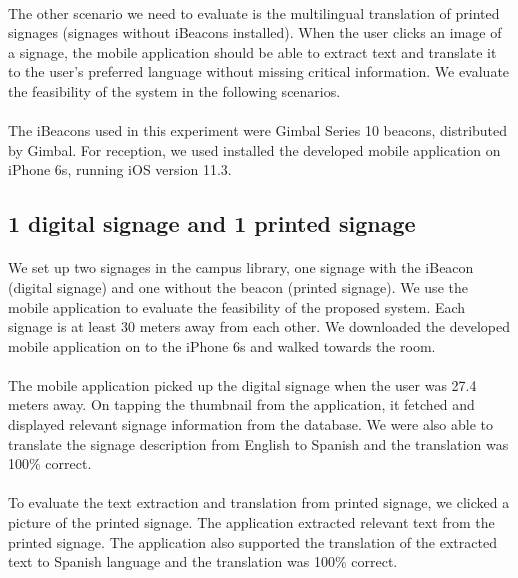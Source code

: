 \documentclass[12pt]{article}
\begin{document}
\paragraph{}The other scenario we need to evaluate is the multilingual translation of printed signages (signages without iBeacons installed). When the user clicks an image of a signage, the mobile application should be able to extract text and translate it to the user's preferred language without missing critical information. We evaluate the feasibility of the system in the following scenarios.

\paragraph{}The iBeacons used in this experiment were Gimbal Series 10 beacons, distributed by Gimbal. For reception, we used installed the developed mobile application on iPhone 6s, running iOS version 11.3.

\subsection{1 digital signage and 1 printed signage }
\label{oneone}
\paragraph{}We set up two signages in the campus library, one signage with the iBeacon (digital signage) and one without the beacon (printed signage). We use the mobile application to evaluate the feasibility of the proposed system. Each signage is at least 30 meters away from each other. We downloaded the developed mobile application on to the iPhone 6s and walked towards the room.

\paragraph{}The mobile application picked up the digital signage when the user was 27.4 meters away. On tapping the thumbnail from the application, it fetched and displayed relevant signage information from the database. We were also able to translate the signage description from English to Spanish and the translation was 100\% correct.

\paragraph{}To evaluate the text extraction and translation from printed signage, we clicked a picture of the printed signage. The application extracted relevant text from the printed signage. The application also supported the translation of the extracted text to Spanish language and the translation was 100\% correct.
\end{document}

